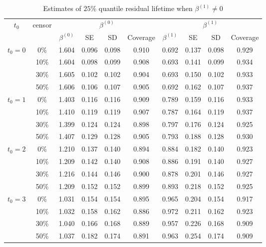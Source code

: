 \documentclass[titlepage,english,12pt]{article}
\begin{document}
	\begin{table}[H] \label{table:4}
		\caption{Estimates of $25\%$ quantile residual lifetime when $\beta^{(1)} \neq 0$}
		\centering
		\begin{tabular}{|c|c|c|c|c|c|c|c|c|c|}
			\hline
			\multirow{2}{*}{$t_0$} & \multirow{2}{*}{censor} & \multicolumn{4}{c|}{$\beta^{(0)}$} & \multicolumn{4}{c|}{$\beta^{(1)}$}\\ \cline{3-10}
			& & $\beta^{(0)}$ & SE & SD  & Coverage  & $\beta^{(1)}$ & SE & SD & Coverage\\
			\hline\hline
			\multirow{4}{*}{$t_0=0$} & 0\% & 1.604 & 0.096 & 0.098 & 0.910 & 0.692 & 0.137 & 0.098 & 0.929 \\
			& 10\% & 1.604 & 0.098 & 0.099 & 0.908 & 0.693 & 0.141 & 0.099 & 0.934 \\
			& 30\% & 1.605 & 0.102 & 0.102 & 0.904 & 0.693 & 0.150 & 0.102 & 0.933 \\
			& 50\% & 1.606 & 0.106 & 0.107 & 0.905 & 0.692 & 0.162 & 0.107 & 0.937 \\
			\hline
			\multirow{4}{*}{$t_0=1$} & 0\% & 1.403 & 0.116 & 0.116 & 0.909 & 0.789 & 0.159 & 0.116 & 0.933 \\
			& 10\% & 1.410 & 0.119 & 0.119 & 0.907 & 0.787 & 0.164 & 0.119 & 0.937 \\
			& 30\% & 1.399 & 0.124 & 0.124 & 0.898 & 0.797 & 0.176 & 0.124 & 0.925 \\
			& 50\% & 1.407 & 0.129 & 0.128 & 0.905 & 0.793 & 0.188 & 0.128 & 0.930 \\
			\hline
			\multirow{4}{*}{$t_0=2$} & 0\% & 1.210 & 0.137 & 0.140 & 0.894 & 0.884 & 0.182 & 0.140 & 0.923 \\
			& 10\% & 1.209 & 0.142 & 0.140 & 0.908 & 0.886 & 0.191 & 0.140 & 0.927 \\
			& 30\% & 1.216 & 0.144 & 0.146 & 0.900 & 0.878 & 0.201 & 0.146 & 0.927 \\
			& 50\% & 1.209 & 0.152 & 0.152 & 0.899 & 0.893 & 0.218 & 0.152 & 0.925 \\
			\hline
			\multirow{4}{*}{$t_0=3$} & 0\% & 1.031 & 0.154 & 0.154 & 0.895 & 0.965 & 0.204 & 0.154 & 0.917 \\
			& 10\% & 1.032 & 0.158 & 0.162 & 0.886 & 0.972 & 0.211 & 0.162 & 0.923 \\
			& 30\% & 1.040 & 0.166 & 0.168 & 0.889 & 0.957 & 0.226 & 0.168 & 0.909 \\
			& 50\% & 1.037 & 0.182 & 0.174 & 0.891 & 0.963 & 0.254 & 0.174 & 0.909 \\
			\hline
		\end{tabular}
	\end{table}
	
\end{document}
